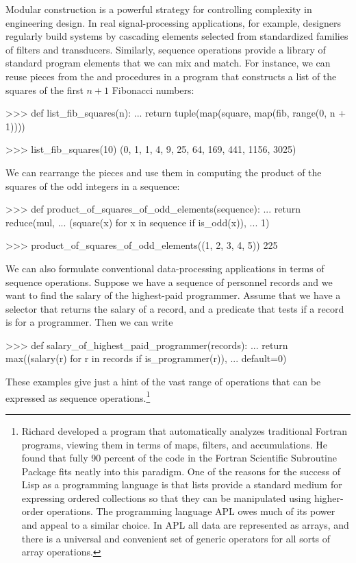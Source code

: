 Modular construction is a powerful strategy for controlling complexity in
engineering design.  In real signal-processing applications, for example,
designers regularly build systems by cascading elements selected from
standardized families of filters and transducers.  Similarly, sequence
operations provide a library of standard program elements that we can mix and
match.  For instance, we can reuse pieces from the  and
 procedures in a program that constructs a list of the squares
of the first \( n + 1 \) Fibonacci numbers:

\begin{codeBlock}
>>> def list_fib_squares(n):
...     return tuple(map(square, map(fib, range(0, n + 1))))

>>> list_fib_squares(10)
(0, 1, 1, 4, 9, 25, 64, 169, 441, 1156, 3025)
\end{codeBlock}

\noindent
We can rearrange the pieces and use them in computing the product of the
squares of the odd integers in a sequence:

\begin{codeBlock}
>>> def product_of_squares_of_odd_elements(sequence):
...     return reduce(mul,
...                   (square(x) for x in sequence if is_odd(x)),
...                   1)

>>> product_of_squares_of_odd_elements((1, 2, 3, 4, 5))
225
\end{codeBlock}

\noindent
We can also formulate conventional data-processing applications in terms of
sequence operations.  Suppose we have a sequence of personnel records and we
want to find the salary of the highest-paid programmer.  Assume that we have a
selector  that returns the salary of a record, and a predicate
 that tests if a record is for a programmer.  Then we can
write

\begin{codeBlock}
>>> def salary_of_highest_paid_programmer(records):
...     return max((salary(r) for r in records if is_programmer(r)),
...                default=0)
\end{codeBlock}

\noindent
These examples give just a hint of the vast range of operations that can be
expressed as sequence operations.\footnote{Richard 
developed a program that automatically analyzes traditional Fortran programs,
viewing them in terms of maps, filters, and accumulations.  He found that fully
90 percent of the code in the Fortran Scientific Subroutine Package fits neatly
into this paradigm.  One of the reasons for the success of Lisp as a
programming language is that lists provide a standard medium for expressing
ordered collections so that they can be manipulated using higher-order
operations.  The programming language APL owes much of its power and appeal to
a similar choice. In APL all data are represented as arrays, and there is a
universal and convenient set of generic operators for all sorts of array
operations.}

